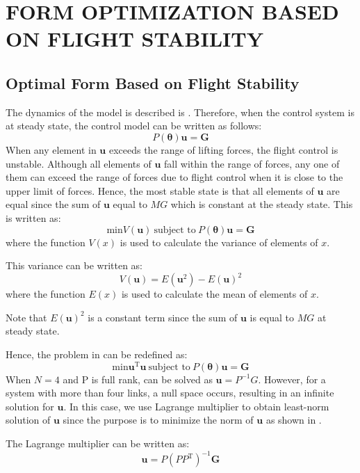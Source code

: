 \section{FORM OPTIMIZATION BASED ON FLIGHT STABILITY}
\subsection{Optimal Form Based on Flight Stability}
The dynamics of the model is described is . Therefore, when the control system is at steady state, the control model can be written as follows:
\begin{equation}
  P(\bm{\theta})\bm{u}=\bm{G}
  \label{eq:steady_state}
\end{equation}
When any element in $\bm{u}$ exceeds the range of lifting forces, the flight control is unstable. Although all elements of $\bm{u}$ fall within the range of forces, any one of them can exceed the range of forces due to flight control when it is close to the upper limit of forces. Hence, the most stable state is that all elements of $\bm{u}$ are equal since the sum of $\bm{u}$ equal to $MG$ which is constant at the steady state. This is written as:
\begin{equation}
  \text{min} V(\bm{u}) \ \text{subject to} \ P(\bm{\theta})\bm{u}=\bm{G}
  \label{eq:optimization}
\end{equation}
where the function $V(x)$ is used to calculate the variance of elements of $x$. 
\par
This variance can be written as:
\begin{equation}
  V(\bm{u})=E(\bm{u}^2)-E(\bm{u})^2
\end{equation}
where the function $E(x)$ is used to calculate the mean of elements of $x$. 
\par
Note that $E(\bm{u})^2$ is a constant term since the sum of $\bm{u}$ is equal to $MG$ at steady state.
\par
Hence, the problem in  can be redefined as:
\begin{equation}
  \text{min}\bm{u}^\mathrm{T}\bm{u} \ \text{subject to} \ P(\bm{\theta})\bm{u}=\bm{G}
  \label{eq:optimization2}
\end{equation}
When $N=4$ and P is full rank,  can be solved as $\bm{u}=P^{-1}G$. However, for a system with more than four links, a null space occurs, resulting in an infinite solution for $\bm{u}$. In this case, we use Lagrange multiplier to obtain least-norm solution of $\bm{u}$ since the purpose is to minimize the norm of $\bm{u}$ as shown in . 
\par
The Lagrange multiplier can be written as:
\begin{equation}
  \bm{u}=P(PP^\mathrm{T})^{-1}\bm{G}
  \label{eq:P_inv}
\end{equation}

